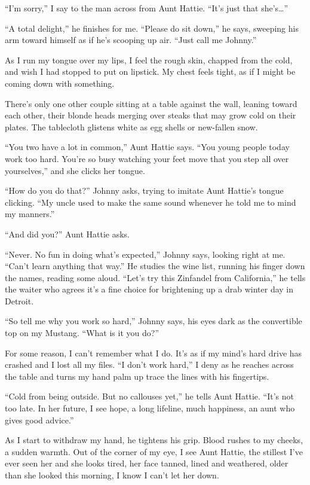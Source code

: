 \documentclass[twoside,10pt]{book}
\begin{document}
``I'm sorry,'' I say to the man across from Aunt Hattie. ``It's just
that she's\ldots''

``A total delight,'' he finishes for me. ``Please do sit down,'' he
says, sweeping his arm toward himself as if he's scooping up air. ``Just
call me Johnny.''

As I run my tongue over my lips, I feel the rough skin, chapped from the
cold, and wish I had stopped to put on lipstick. My chest feels tight,
as if I might be coming down with something.

There's only one other couple sitting at a table against the wall,
leaning toward each other, their blonde heads merging over steaks that
may grow cold on their plates. The tablecloth glistens white as egg
shells or new-fallen snow.

``You two have a lot in common,'' Aunt Hattie says. ``You young people
today work too hard. You're so busy watching your feet move that you
step all over yourselves,'' and she clicks her tongue.

``How do you do that?'' Johnny asks, trying to imitate Aunt Hattie's
tongue clicking. ``My uncle used to make the same sound whenever he told
me to mind my manners.''

``And did you?'' Aunt Hattie asks.

``Never. No fun in doing what's expected,'' Johnny says, looking right
at me. ``Can't learn any­thing that way.'' He studies the wine list,
running his finger down the names, reading some aloud. ``Let's try this
Zinfandel from California,'' he tells the waiter who agrees it's a fine
choice for brighten­ing up a drab winter day in Detroit.

``So tell me why you work so hard,'' Johnny says, his eyes dark as the
convertible top on my Mustang. ``What is it you do?''

For some reason, I can't remember what I do. It's as if my mind's hard
drive has crashed and I lost all my files. ``I don't work hard,'' I deny
as he reaches across the table and turns my hand palm up trace the lines
with his fingertips.

``Cold from being outside. But no callouses yet,'' he tells Aunt Hattie.
``It's not too late. In her future, I see hope, a long lifeline, much
happiness, an aunt who gives good advice.''

As I start to withdraw my hand, he tightens his grip. Blood rushes to my
cheeks, a sudden warmth. Out of the corner of my eye, I see Aunt Hattie,
the stillest I've ever seen her and she looks tired, her face tanned,
lined and weathered, older than she looked this morning, I know I can't
let her down.
\end{document}
